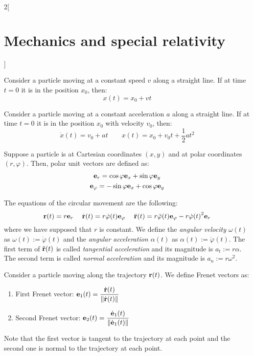 \documentclass[../../../main.tex]{subfiles}
\begin{document}
\begin{multicols}{2}[\section{Mechanics and special relativity}]
\begin{definition}
    \end{definition}
    \begin{prop}
        Consider a particle moving at a constant speed $v$ along a straight line. If at time $t=0$ it is in the position $x_0$, then: $$x(t)=x_0+vt$$
    \end{prop}
    \begin{prop}
        Consider a particle moving at a constant acceleration $a$ along a straight line. If at time $t=0$ it is in the position $x_0$ with velocity $v_0$, then:
        $$\dot{x}(t)=v_0+at\qquad x(t)=x_0+v_0t+\frac{1}{2}at^2$$
    \end{prop}
    \begin{definition}
        Suppose a particle is at Cartesian coordinates $(x,y)$ and at polar coordinates $(r,\varphi)$. Then, polar unit vectors are defined as:
        \begin{gather*}
            \boldsymbol{\mathrm{e}}_r=\cos\varphi\boldsymbol{\mathrm{e}}_x+\sin\varphi\boldsymbol{\mathrm{e}}_y\\
            \boldsymbol{\mathrm{e}}_\varphi=-\sin\varphi\boldsymbol{\mathrm{e}}_x+\cos\varphi\boldsymbol{\mathrm{e}}_y
        \end{gather*}
    \end{definition}
    \begin{definition}
        The equations of the circular movement are the following: $$\boldsymbol{\mathrm{r}}(t)=r\boldsymbol{\mathrm{e}}_r\quad\;\dot{\boldsymbol{\mathrm{r}}}(t)=r\dot{\varphi}(t)\boldsymbol{\mathrm{e}}_\varphi\quad\;\ddot{\boldsymbol{\mathrm{r}}}(t)=r\ddot{\varphi}(t)\boldsymbol{\mathrm{e}}_\varphi-r{\dot{\varphi}(t)}^2\boldsymbol{\mathrm{e}}_r$$ where we have supposed that $r$ is constant. We define the \textit{angular velocity $\omega(t)$} as $\omega(t):=\dot{\varphi}(t)$ and the \textit{angular acceleration $\alpha(t)$} as $\alpha(t):=\ddot{\varphi}(t)$. The first term of $\ddot{\boldsymbol{\mathrm{r}}}(t)$ is called \textit{tangential acceleration} and its magnitude is $a_t:=r\alpha$. The second term is called \textit{normal acceleration} and its magnitude is $a_n:=r\omega^2$.
    \end{definition}
    \begin{definition}
        Consider a particle moving along the trajectory $\boldsymbol{\mathrm{r}}(t)$. We define Frenet vectors as:
        \begin{enumerate}
            \item First Frenet vector: $\displaystyle\boldsymbol{\mathrm{e}}_1(t)=\frac{\dot{\boldsymbol{\mathrm{r}}}(t)}{\|\dot{\boldsymbol{\mathrm{r}}}(t)\|}$
            \item Second Frenet vector: $\displaystyle\boldsymbol{\mathrm{e}}_2(t)=\frac{\dot{\boldsymbol{\mathrm{e}}}_1(t)}{\|\dot{\boldsymbol{\mathrm{e}}}_1(t)\|}$
        \end{enumerate}
        Note that the first vector is tangent to the trajectory at each point and the second one is normal to the trajectory at each point.


\end{definition}
\end{multicols}
\end{document}
